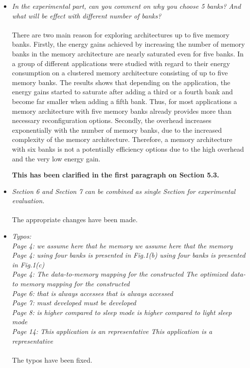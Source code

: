 \documentclass[12pt,a4paper,notitlepage]{article}
\begin{document}
\begin{itemize}
\item \textit{In the experimental part, can you comment on why you choose 5 banks? And what will be effect with different number of banks?}
\\
\\
There are two main reason for exploring architectures up to five memory banks.
Firstly, the energy gains achieved by increasing the number of memory banks in the memory architecture are nearly saturated even for five banks.
In \cite{filippopoulos2013exploration} a group of different applications were studied with regard to their energy consumption on a clustered memory architecture consisting of up to five memory banks.
The results shows that depending on the application, the energy gains started to saturate after adding a third or a fourth bank and become far smaller when adding a fifth bank.
Thus, for most applications a memory architecture with five memory banks already provides more than necessary reconfiguration options.  
Secondly, the overhead increases exponentially with the number of memory banks, due to the increased complexity of the memory architecture. 
Therefore, a memory architecture with six banks is not a potentially efficiency options due to the high overhead and the very low energy gain.

\textbf{This has been clarified in the first paragraph on Section 5.3.}

\item \textit{Section 6 and Section 7 can be combined as single Section for experimental evaluation.}
\\
\\
The appropriate changes have been made.

\item 
\textit{Typos: \\ 
Page 4: we assume here that he memory \textrightarrow we assume here that the memory\\ 
Page 4: using four banks is presented in Fig.1(b) \textrightarrow using four banks is presented in Fig.1(c) \\ 
Page 4: The data-to-memory mapping for the constructed \textrightarrow The optimized data-to memory mapping for the constructed \\ 
Page 6: that is always accesses \textrightarrow that is always accessed \\ 
Page 7: must developed \textrightarrow must be developed \\ 
Page 8: is higher compared to sleep mode \textrightarrow is higher compared to light sleep mode \\ Page 14: This application is an representative \textrightarrow This application is a representative}
\\
\\
The typos have been fixed.

\end{itemize}
\end{document}
